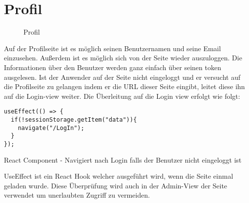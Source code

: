 \section{Profil}
\label{profile}

\begin{figure}[H]
    \begin{center}
      \caption{Profil}
    \end{center}
\end{figure}

Auf der Profilseite ist es möglich seinen Benutzernamen und seine Email einzusehen. Außerdem ist es  
möglich sich von der Seite wieder auszuloggen. Die Informationen über den Benutzer werden ganz einfach über 
seinen token ausgelesen. Ist der Anwender auf der Seite nicht eingeloggt und er versucht auf die Profilseite
zu gelangen indem er die URL dieser Seite eingibt, leitet diese ihn auf die Login-view weiter. Die
Überleitung auf die Login view erfolgt wie folgt:

\begin{code}[htp]
\begin{lstlisting}
useEffect(() => {
  if(!sessionStorage.getItem("data")){
    navigate("/LogIn");
  }
});
\end{lstlisting}
\caption{React Component - Navigiert nach Login falls der Benutzer nicht eingeloggt ist}
\end{code}

UseEffect ist ein React Hook welcher ausgeführt wird, wenn die Seite einmal geladen wurde. Diese 
Überprüfung wird auch in der Admin-View der Seite verwendet um unerlaubten Zugriff zu vermeiden.